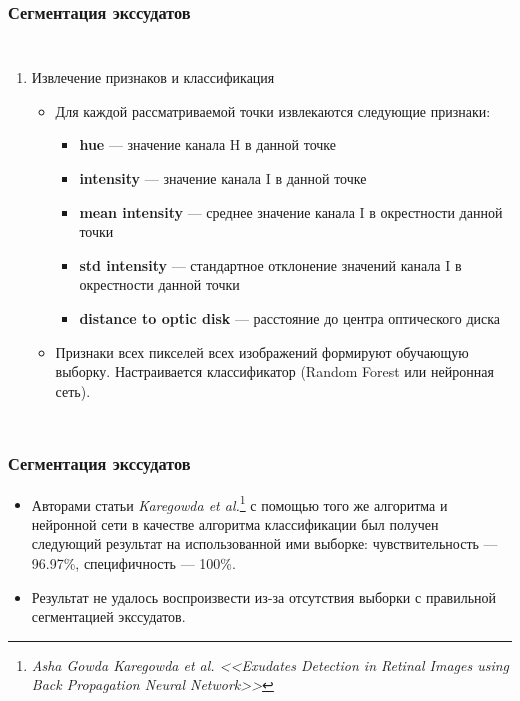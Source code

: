 \documentclass{beamer}
\let\oldfootnote\footnote
\renewcommand\footnote[1][]{\oldfootnote[frame,#1]}
\begin{document}
\begin{frame}
	\frametitle{Сегментация экссудатов}
	
	\begin{columns}[c]
		
		\begin{enumerate}
			\footnotesize
			\setcounter{enumi}{1}
			\item Извлечение признаков и классификация
			\begin{itemize}
				\item Для каждой рассматриваемой точки извлекаются следующие признаки:
				\begin{itemize}
					\item \textbf{hue} --- значение канала H в данной точке
					\item \textbf{intensity} --- значение канала I в данной точке
					\item \textbf{mean intensity} --- среднее значение канала I в окрестности данной точки
					\item \textbf{std intensity} --- стандартное отклонение значений канала I в окрестности данной точки
					\item \textbf{distance to optic disk} --- расстояние до центра оптического диска
				\end{itemize}
				\item Признаки всех пикселей всех изображений формируют обучающую выборку. Настраивается классификатор (Random Forest или нейронная сеть).
				\normalsize
			\end{itemize}
		\end{enumerate}
		
	\end{columns}
\end{frame}


\begin{frame}
	\frametitle{Сегментация экссудатов}
	
	\begin{itemize}
		\item Авторами статьи \textit{Karegowda et al.}\footnote{\textit{Asha Gowda Karegowda et al. <<Exudates Detection in Retinal Images using Back Propagation Neural Network>>}} с помощью того же алгоритма и нейронной сети в качестве алгоритма классификации был получен следующий результат на использованной ими выборке: чувствительность --- 96.97\%, специфичность --- 100\%. 
		\item Результат не удалось воспроизвести из-за отсутствия выборки с правильной сегментацией экссудатов.
	\end{itemize}
\end{frame}
\end{document}
